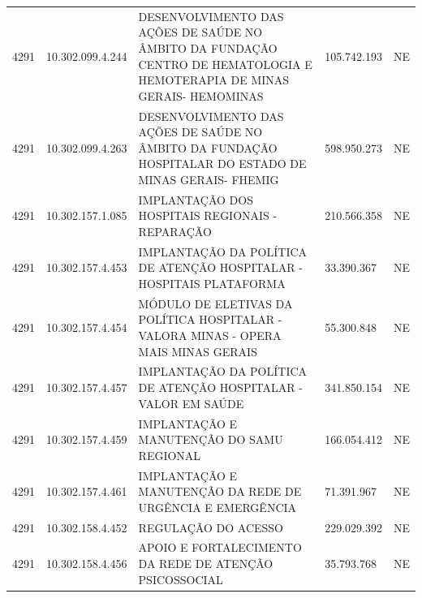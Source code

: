 \documentclass{article}
\begin{document}
\begin{longtable}[c]{m{1cm}|m{2cm}|m{10cm}|m{2cm}|m{1cm}}
\multicolumn{1}{C{1cm}|}{4291} & \multicolumn{1}{C{2cm}|}{10.302.099.4.244} & \multicolumn{1}{L{10cm}|}{DESENVOLVIMENTO DAS AÇÕES DE SAÚDE NO ÂMBITO DA FUNDAÇÃO CENTRO DE HEMATOLOGIA E HEMOTERAPIA DE MINAS GERAIS- HEMOMINAS} & \multicolumn{1}{R{2cm}|}{105.742.193} & \multicolumn{1}{C{1cm}}{NE} \\
\multicolumn{1}{C{1cm}|}{4291} & \multicolumn{1}{C{2cm}|}{10.302.099.4.263} & \multicolumn{1}{L{10cm}|}{DESENVOLVIMENTO DAS AÇÕES DE SAÚDE NO ÂMBITO DA FUNDAÇÃO HOSPITALAR DO ESTADO DE MINAS GERAIS- FHEMIG} & \multicolumn{1}{R{2cm}|}{598.950.273} & \multicolumn{1}{C{1cm}}{NE} \\
\multicolumn{1}{C{1cm}|}{4291} & \multicolumn{1}{C{2cm}|}{10.302.157.1.085} & \multicolumn{1}{L{10cm}|}{IMPLANTAÇÃO DOS HOSPITAIS REGIONAIS - REPARAÇÃO} & \multicolumn{1}{R{2cm}|}{210.566.358} & \multicolumn{1}{C{1cm}}{NE} \\
\multicolumn{1}{C{1cm}|}{4291} & \multicolumn{1}{C{2cm}|}{10.302.157.4.453} & \multicolumn{1}{L{10cm}|}{IMPLANTAÇÃO DA POLÍTICA DE ATENÇÃO HOSPITALAR - HOSPITAIS PLATAFORMA} & \multicolumn{1}{R{2cm}|}{33.390.367} & \multicolumn{1}{C{1cm}}{NE} \\
\multicolumn{1}{C{1cm}|}{4291} & \multicolumn{1}{C{2cm}|}{10.302.157.4.454} & \multicolumn{1}{L{10cm}|}{MÓDULO DE ELETIVAS DA POLÍTICA HOSPITALAR - VALORA MINAS - OPERA MAIS MINAS GERAIS} & \multicolumn{1}{R{2cm}|}{55.300.848} & \multicolumn{1}{C{1cm}}{NE} \\
\multicolumn{1}{C{1cm}|}{4291} & \multicolumn{1}{C{2cm}|}{10.302.157.4.457} & \multicolumn{1}{L{10cm}|}{IMPLANTAÇÃO DA POLÍTICA DE ATENÇÃO HOSPITALAR - VALOR EM SAÚDE} & \multicolumn{1}{R{2cm}|}{341.850.154} & \multicolumn{1}{C{1cm}}{NE} \\
\multicolumn{1}{C{1cm}|}{4291} & \multicolumn{1}{C{2cm}|}{10.302.157.4.459} & \multicolumn{1}{L{10cm}|}{IMPLANTAÇÃO E MANUTENÇÃO DO SAMU REGIONAL} & \multicolumn{1}{R{2cm}|}{166.054.412} & \multicolumn{1}{C{1cm}}{NE} \\
\multicolumn{1}{C{1cm}|}{4291} & \multicolumn{1}{C{2cm}|}{10.302.157.4.461} & \multicolumn{1}{L{10cm}|}{IMPLANTAÇÃO E MANUTENÇÃO DA REDE DE URGÊNCIA E EMERGÊNCIA} & \multicolumn{1}{R{2cm}|}{71.391.967} & \multicolumn{1}{C{1cm}}{NE} \\
\multicolumn{1}{C{1cm}|}{4291} & \multicolumn{1}{C{2cm}|}{10.302.158.4.452} & \multicolumn{1}{L{10cm}|}{REGULAÇÃO DO ACESSO} & \multicolumn{1}{R{2cm}|}{229.029.392} & \multicolumn{1}{C{1cm}}{NE} \\
\multicolumn{1}{C{1cm}|}{4291} & \multicolumn{1}{C{2cm}|}{10.302.158.4.456} & \multicolumn{1}{L{10cm}|}{APOIO E FORTALECIMENTO DA REDE DE ATENÇÃO PSICOSSOCIAL} & \multicolumn{1}{R{2cm}|}{35.793.768} & \multicolumn{1}{C{1cm}}{NE} \\

\end{longtable}
\end{document}
